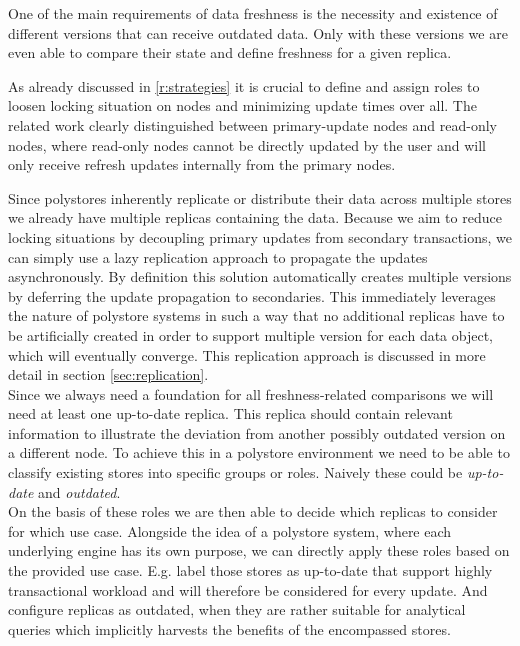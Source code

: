 One of the main requirements of data freshness is the necessity and existence of different versions that can receive outdated data. 
Only with these versions we are even able to compare their state and define freshness for a given replica.

As already discussed in \ref{r:strategies} it is crucial to define and assign roles to loosen locking situation on nodes
and minimizing update times over all.
The related work clearly distinguished between primary-update nodes and read-only nodes, where 
read-only nodes cannot be directly updated by the user and will only receive refresh updates internally from the primary nodes.

Since polystores inherently replicate or distribute their data across multiple stores we already have multiple replicas containing the data. 
Because we aim to reduce locking situations by decoupling primary updates from secondary transactions,
we can simply use a lazy replication approach to propagate the updates asynchronously. 
By definition this solution automatically creates multiple versions by deferring the update propagation to secondaries.
This immediately leverages the nature of polystore systems in such a way that no additional replicas have to be artificially created in order 
to support multiple version for each data object, which will eventually converge. 
This replication approach is discussed in more detail in section \ref{sec:replication}.\\


Since we always need a foundation for all freshness-related comparisons we will need at least one up-to-date replica. 
This replica should contain relevant information to illustrate the deviation from another possibly outdated version on a different node.
To achieve this in a polystore environment we need to be able to classify existing stores into specific groups or roles.
Naively these could be \emph{up-to-date} and \emph{outdated}.\\
On the basis of these roles we are then able to decide which replicas to consider for which use case.
Alongside the idea of a polystore system, where each underlying engine has its own purpose, we can directly apply these roles 
based on the provided use case. E.g. label those stores as up-to-date that support highly transactional workload and will therefore be considered for every update.
And configure replicas as outdated, when they are rather suitable for analytical queries which implicitly harvests the benefits of the encompassed stores. \\

